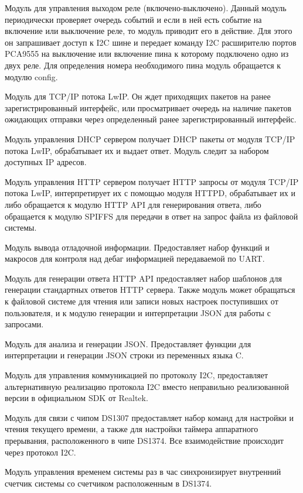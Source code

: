 Модуль для управления выходом реле (включено-выключено).
Данный модуль периодически проверяет очередь событий и если в ней есть событие на включение или выключение реле, то модуль приводит его в действие. Для этого он запрашивает доступ к I2C шине и передает команду I2C расширителю портов PCA9555 на выключение или включение пина к которому подключено одно из двух реле. Для определения номера необходимого пина модуль обращается к модулю config. 

Модуль для TCP/IP потока LwIP. Он ждет приходящих пакетов на ранее зарегистрированный интерфейс, или просматривает очередь на наличие пакетов ожидающих отправки через определенный ранее зарегистрированный интерфейс.

Модуль управления DHCP сервером получает DHCP пакеты от модуля TCP/IP потока LwIP, обрабатывает их и выдает ответ. Модуль следит за набором доступных IP адресов.

Модуль управления HTTP сервером получает HTTP запросы от модуля TCP/IP потока LwIP, интерпретирует их с помощью модуля HTTPD, обрабатывает их и либо обращается к модулю HTTP API для генерирования ответа, либо обращается к модулю SPIFFS для передачи в ответ на запрос файла из файловой системы. 

Модуль вывода отладочной информации.
Предоставляет набор функций и макросов для контроля над дебаг информацией передаваемой по UART.

Модуль для генерации ответа HTTP API предоставляет набор шаблонов для генерации стандартных ответов HTTP сервера. Также модуль может обращаться к файловой системе для чтения или записи новых настроек поступивших от пользователя, и к модулю генерации и интерпретации JSON для работы с запросами.

Модуль для анализа и генерации JSON.
Предоставляет функции для интерпретации и генерации JSON строки из переменных языка C.

Модуль для управления коммуникацией по протоколу I2C, предоставляет альтернативную реализацию протокола I2C вместо неправильно реализованной версии в официальном SDK от Realtek.

Модуль для связи с чипом DS1307 предоставляет набор команд для настройки и чтения текущего времени, а также для настройки таймера аппаратного прерывания, расположенного в чипе DS1374. Все взаимодействие происходит через протокол I2C.

Модуль управления временем системы раз в час синхронизирует внутренний счетчик системы со счетчиком расположенным в DS1374.

